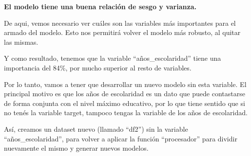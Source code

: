 \documentclass[a4paper]{article}
\begin{document}
        \textbf{El modelo tiene una buena relación de sesgo y varianza.}

        De aqui, vemos necesario ver cuáles son las variables más importantes para el armado del modelo. Esto nos permitirá volver el modelo más robusto, al quitar las mismas. 

        Y como resultado, tenemos que la variable ``años\_escolaridad'' tiene una importancia del 84\%, por mucho superior al resto de variables.


        Por lo tanto, vamos a tener que desarrollar un nuevo modelo sin esta variable. El principal motivo es que los años de escolaridad es un dato que puede contastarse de forma conjunta con el nivel máximo educativo, por lo que tiene sentido que si no tenés la variable target, tampoco tengas la variable de los años de escolaridad.

        Así, creamos un dataset nuevo (llamado ``df2'') sin la variable ``años\_escolaridad'', para volver a aplicar la función ``procesador'' para dividir nuevamente el mismo y generar nuevos modelos.

        
\end{document}
